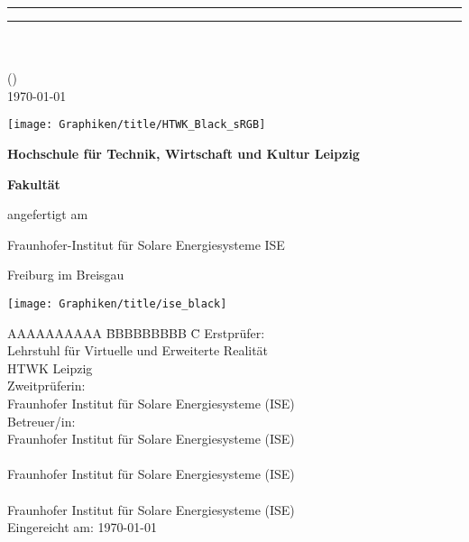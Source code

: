 \begin{titlepage}
\thispagestyle{empty}
\quad
\addtocounter{page}{-1}
{\centering
{\large \doublespacing \arbeit}
\vspace{0.4cm}
\rule{\textwidth}{0.4pt}
{\Large  \textbf {\titel}}
\rule{\textwidth}{0.4pt}}
{\vspace{0.5cm}\\}
{\centering
{\autor\\[3ex]}
{(\mnr)\\ [3ex]}
{\today}\\}

\vspace{0.7cm}
\begin{center}
	\texttt{[image: Graphiken/title/HTWK\_Black\_sRGB]}	
\end{center}
{\centering
{\textbf{Hochschule für Technik, Wirtschaft und Kultur Leipzig}\par}
{\textbf{Fakultät \FIM} \par}
\vspace{2.5cm}
{angefertigt am \par}
{Fraunhofer-Institut für Solare Energiesysteme ISE \par}
{\centering
{Freiburg im Breisgau \par}
}}
\vfill
\begin{center}
	\texttt{[image: Graphiken/title/ise\_black]}
\end{center}

\newpage
\thispagestyle{empty}
\quad
\addtocounter{page}{-1}


\vspace*{\fill}
\begin{tabbing}
	AAAAAAAAAA \= BBBBBBBBB \= C\kill
	Erstprüfer: \>\betreuerhs \\ \> Lehrstuhl für Virtuelle und Erweiterte Realität \\ 	\>HTWK Leipzig \\
	Zweitprüferin: \>\betreuerbetc \\ \> Fraunhofer Institut für Solare Energiesysteme (ISE) \\
	Betreuer/in: \>\betreuerbeta\\ 
	\> Fraunhofer Institut für Solare Energiesysteme (ISE) \\
	\> \betreuerbetc \\ 
	\> Fraunhofer Institut für Solare Energiesysteme (ISE) \\
	\> \betreuerbetb \\
	\> Fraunhofer Institut für Solare Energiesysteme (ISE) \\
	Eingereicht am: \>\today \\
\end{tabbing}

\end{titlepage}